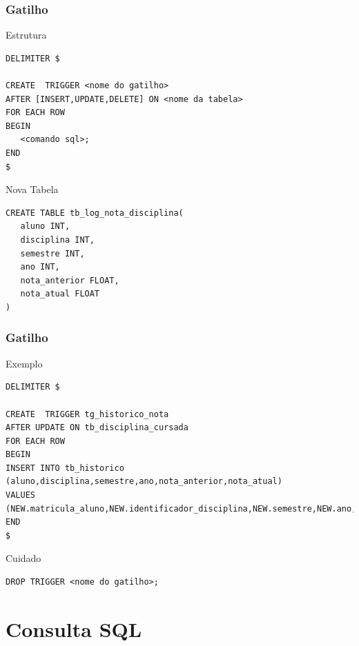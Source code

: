 \documentclass{beamer}
\begin{document}
\begin{frame}[fragile]
\frametitle{Gatilho}

\begin{block}{Estrutura}
	\begin{lstlisting}
DELIMITER $

CREATE  TRIGGER <nome do gatilho> 
AFTER [INSERT,UPDATE,DELETE] ON <nome da tabela> 
FOR EACH ROW 
BEGIN 
   <comando sql>;
END
$
	\end{lstlisting}
\end{block}\vfill

\begin{exampleblock}{Nova Tabela}
	\begin{lstlisting}
CREATE TABLE tb_log_nota_disciplina(
   aluno INT,
   disciplina INT,
   semestre INT,
   ano INT,
   nota_anterior FLOAT,
   nota_atual FLOAT
)
	\end{lstlisting}
\end{exampleblock}
\end{frame}

\begin{frame}[fragile]
\frametitle{Gatilho}

\begin{exampleblock}{Exemplo}
	\begin{lstlisting}
DELIMITER $

CREATE  TRIGGER tg_historico_nota 
AFTER UPDATE ON tb_disciplina_cursada 
FOR EACH ROW 
BEGIN 
INSERT INTO tb_historico (aluno,disciplina,semestre,ano,nota_anterior,nota_atual) 
VALUES
(NEW.matricula_aluno,NEW.identificador_disciplina,NEW.semestre,NEW.ano,OLD.nota,NEW.nota); 
END
$
	\end{lstlisting}
\end{exampleblock}\vfill

\begin{alertblock}{Cuidado}
	\begin{lstlisting}
DROP TRIGGER <nome do gatilho>;
	\end{lstlisting}
\end{alertblock}
\end{frame}

\section{Consulta SQL}
\end{document}
